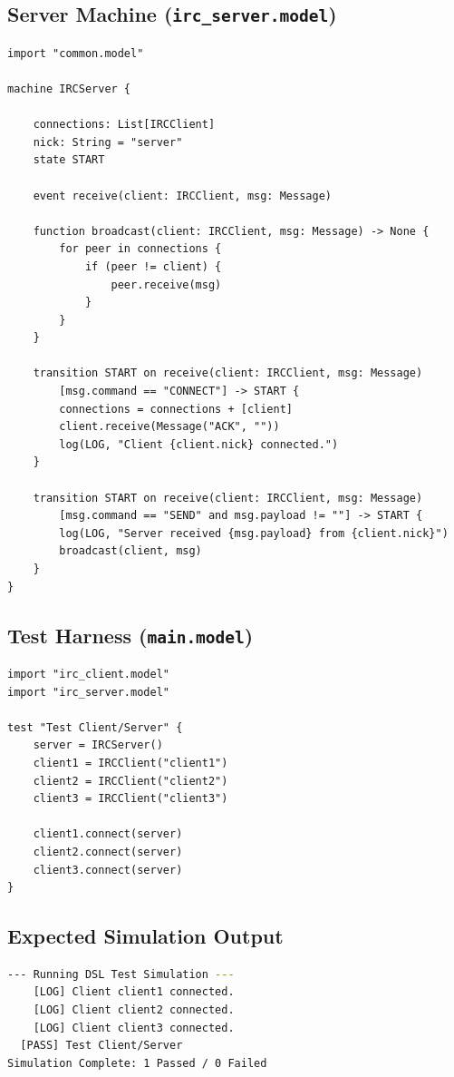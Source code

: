 \documentclass[11pt,letterpaper]{article}
\begin{document}
\subsection{Server Machine (\texttt{irc\_server.model})}

\begin{lstlisting}
import "common.model"

machine IRCServer {

    connections: List[IRCClient]
    nick: String = "server"
    state START

    event receive(client: IRCClient, msg: Message)

    function broadcast(client: IRCClient, msg: Message) -> None {
        for peer in connections {
            if (peer != client) {
                peer.receive(msg)
            }
        }
    }

    transition START on receive(client: IRCClient, msg: Message)
        [msg.command == "CONNECT"] -> START {
        connections = connections + [client]
        client.receive(Message("ACK", ""))
        log(LOG, "Client {client.nick} connected.")
    }

    transition START on receive(client: IRCClient, msg: Message)
        [msg.command == "SEND" and msg.payload != ""] -> START {
        log(LOG, "Server received {msg.payload} from {client.nick}")
        broadcast(client, msg)
    }
}
\end{lstlisting}

\subsection{Test Harness (\texttt{main.model})}

\begin{lstlisting}
import "irc_client.model"
import "irc_server.model"

test "Test Client/Server" {
    server = IRCServer()
    client1 = IRCClient("client1")
    client2 = IRCClient("client2")
    client3 = IRCClient("client3")

    client1.connect(server)
    client2.connect(server)
    client3.connect(server)
}
\end{lstlisting}

\subsection{Expected Simulation Output}

\begin{lstlisting}[language=bash,numbers=none]
--- Running DSL Test Simulation ---
    [LOG] Client client1 connected.
    [LOG] Client client2 connected.
    [LOG] Client client3 connected.
  [PASS] Test Client/Server
Simulation Complete: 1 Passed / 0 Failed
\end{lstlisting}
\end{document}
